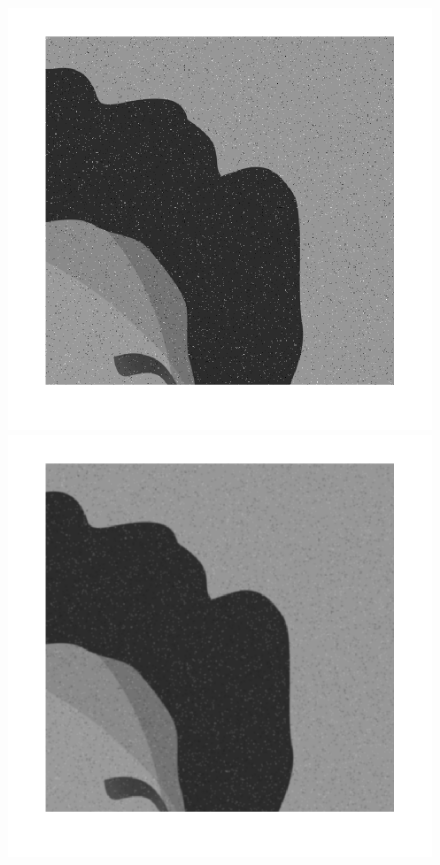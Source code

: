 \begin{figure}[htb] \centering
\includegraphics[scale=0.25]{Pictures/Esempi di utilizzo/Esempio 2/raffo_originale_dettaglio.png}
\includegraphics[scale=0.25]{Pictures/Esempi di utilizzo/Esempio 2/raffo_filtrata_n_iter10_dettaglio.png}

\end{figure}
